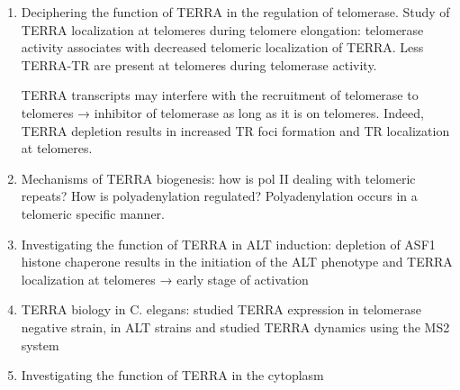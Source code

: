 \begin{enumerate}
\def\labelenumi{\arabic{enumi}.}
\tightlist
\item
  Deciphering the function of TERRA in the regulation of telomerase.
  Study of TERRA localization at telomeres during telomere elongation:
  telomerase activity associates with decreased telomeric localization
  of TERRA. Less TERRA-TR are present at telomeres during telomerase
  activity.

TERRA transcripts may interfere with the recruitment of telomerase to
telomeres → inhibitor of telomerase as long as it is on telomeres.
Indeed, TERRA depletion results in increased TR foci formation and TR
localization at telomeres.

\item
  Mechanisms of TERRA biogenesis: how is pol II dealing with telomeric
  repeats? How is polyadenylation regulated? Polyadenylation occurs in a
  telomeric specific manner.
\item
  Investigating the function of TERRA in ALT induction: depletion of
  ASF1 histone chaperone results in the initiation of the ALT phenotype
  and TERRA localization at telomeres → early stage of activation
\item
  TERRA biology in C. elegans: studied TERRA expression in telomerase
  negative strain, in ALT strains and studied TERRA dynamics using the
  MS2 system
\item
  Investigating the function of TERRA in the cytoplasm
\end{enumerate}

